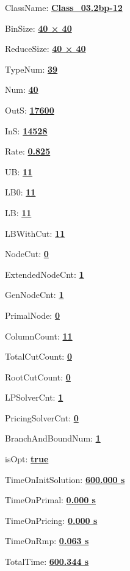\documentclass[11pt]{article}
\begin{document}
\pagestyle{empty}


ClassName: \underline{\textbf{Class_03.2bp-12}}
\par
BinSize: \underline{\textbf{40 × 40}}
\par
ReduceSize: \underline{\textbf{40 × 40}}
\par
TypeNum: \underline{\textbf{39}}
\par
Num: \underline{\textbf{40}}
\par
OutS: \underline{\textbf{17600}}
\par
InS: \underline{\textbf{14528}}
\par
Rate: \underline{\textbf{0.825}}
\par
UB: \underline{\textbf{11}}
\par
LB0: \underline{\textbf{11}}
\par
LB: \underline{\textbf{11}}
\par
LBWithCut: \underline{\textbf{11}}
\par
NodeCut: \underline{\textbf{0}}
\par
ExtendedNodeCnt: \underline{\textbf{1}}
\par
GenNodeCnt: \underline{\textbf{1}}
\par
PrimalNode: \underline{\textbf{0}}
\par
ColumnCount: \underline{\textbf{11}}
\par
TotalCutCount: \underline{\textbf{0}}
\par
RootCutCount: \underline{\textbf{0}}
\par
LPSolverCnt: \underline{\textbf{1}}
\par
PricingSolverCnt: \underline{\textbf{0}}
\par
BranchAndBoundNum: \underline{\textbf{1}}
\par
isOpt: \underline{\textbf{true}}
\par
TimeOnInitSolution: \underline{\textbf{600.000 s}}
\par
TimeOnPrimal: \underline{\textbf{0.000 s}}
\par
TimeOnPricing: \underline{\textbf{0.000 s}}
\par
TimeOnRmp: \underline{\textbf{0.063 s}}
\par
TotalTime: \underline{\textbf{600.344 s}}
\par
\newpage


\end{document}
